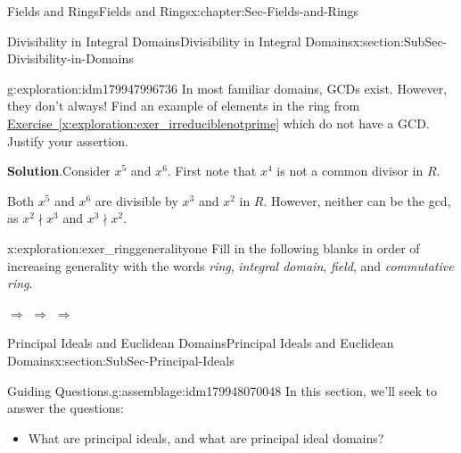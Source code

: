 \documentclass[oneside,10pt,]{book}
\newcommand{\blocktitlefont}{\relax}
\newcommand{\xreffont}{\relax}
\numberwithin{equation}{section}
\begin{document}
\begin{chapterptx}{Fields and Rings}{}{Fields and Rings}{}{}{x:chapter:Sec-Fields-and-Rings}
\begin{sectionptx}{Divisibility in Integral Domains}{}{Divisibility in Integral Domains}{}{}{x:section:SubSec-Divisibility-in-Domains}
\begin{exploration}{}{g:exploration:idm179947996736}
In most familiar domains, GCDs exist. However, they don't always! Find an example of elements in the ring from \hyperref[x:exploration:exer_irreduciblenotprime]{Exercise~{\xreffont\ref{x:exploration:exer_irreduciblenotprime}}} which do not have a GCD. Justify your assertion.%
\par\smallskip%
\noindent\textbf{\blocktitlefont Solution}.\hypertarget{g:solution:idm179948055824}{}\quad{}Consider \(x^5\) and \(x^6\). First note that \(x^4\) is not a common divisor in \(R\).%
\par
Both \(x^5\) and \(x^6\) are divisible by \(x^3\) and \(x^2\) in \(R\). However, neither can be the gcd, as \(x^2\nmid x^3\) and \(x^3\nmid x^2\).%
\end{exploration}
\begin{exploration}{}{x:exploration:exer_ringgeneralityone}%
Fill in the following blanks in order of increasing generality with the words \emph{ring}, \emph{integral domain}, \emph{field}, and \emph{commutative ring}.%
\par
\textunderscore{}\textunderscore{}\textunderscore{}\textunderscore{}\textunderscore{}\textunderscore{}\textunderscore{}\textunderscore{}\textunderscore{}\textunderscore{} \(\Rightarrow\) \textunderscore{}\textunderscore{}\textunderscore{}\textunderscore{}\textunderscore{}\textunderscore{}\textunderscore{}\textunderscore{}\textunderscore{}\textunderscore{} \(\Rightarrow\) \textunderscore{}\textunderscore{}\textunderscore{}\textunderscore{}\textunderscore{}\textunderscore{}\textunderscore{}\textunderscore{}\textunderscore{}\textunderscore{} \(\Rightarrow\) \textunderscore{}\textunderscore{}\textunderscore{}\textunderscore{}\textunderscore{}\textunderscore{}\textunderscore{}\textunderscore{}\textunderscore{}\textunderscore{}%
\end{exploration}
\end{sectionptx}
%
%
\typeout{************************************************}
\typeout{************************************************}
%
\begin{sectionptx}{Principal Ideals and Euclidean Domains}{}{Principal Ideals and Euclidean Domains}{}{}{x:section:SubSec-Principal-Ideals}
\begin{assemblage}{Guiding Questions.}{g:assemblage:idm179948070048}%
In this section, we'll seek to answer the questions: %
\begin{itemize}[label=\textbullet]
\item{}What are principal ideals, and what are principal ideal domains?%

\end{itemize}
\end{assemblage}
\end{sectionptx}
\end{chapterptx}
\end{document}
